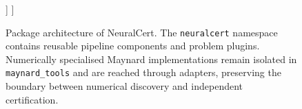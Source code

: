 \begin{figure}[tbp]
\begin{forest}
      ]
    ]
  \end{forest}
  \caption{Package architecture of NeuralCert. The \texttt{neuralcert}
  namespace contains reusable pipeline components and problem plugins.
  Numerically specialised Maynard implementations remain isolated in
  \texttt{maynard\_tools} and are reached through adapters, preserving the
  boundary between numerical discovery and independent certification.}
  \label{fig:neuralcert-package-architecture}
\end{figure}
